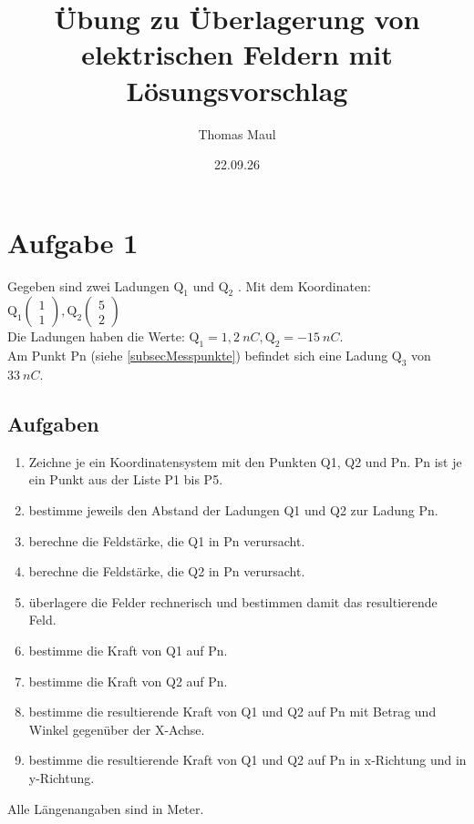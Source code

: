 \documentclass[a4paper,10pt,pdftex,pagesize]{scrartcl}
\author{Thomas Maul}
\title{Übung zu Überlagerung von elektrischen Feldern mit Lösungsvorschlag}
\date{22.09.26}
\begin{document}

\section{Aufgabe 1}
Gegeben sind zwei Ladungen $\text{Q}_1$
und
$\text{Q}_2$ . Mit dem Koordinaten:
\\ $\text{Q}_1 \left( \begin{array}{c} 1\\ 1\end{array} \right), \text{Q}_2 \left( \begin{array}{c} 5\\2                                                  \end{array}
\right)$
\\
Die Ladungen haben die Werte:
$\text{Q}_1 = 1,2\ nC, \text{Q}_2 = -15\ nC$.\\
Am Punkt Pn (siehe \ref{subsecMesspunkte}) befindet sich eine Ladung $\text{Q}_3$ von $33\ nC$.
\subsection{Aufgaben}
\begin{enumerate}
 \item Zeichne je ein Koordinatensystem mit den Punkten Q1, Q2 und Pn. Pn ist je ein Punkt aus der Liste P1 bis P5.
 \item bestimme jeweils den Abstand der Ladungen Q1 und Q2 zur Ladung Pn.
 \item berechne die Feldstärke, die Q1 in Pn verursacht.
 \item berechne die Feldstärke, die Q2 in Pn verursacht.
 \item überlagere die Felder rechnerisch und bestimmen damit das resultierende Feld.
 \item bestimme die Kraft von Q1 auf Pn.
 \item bestimme die Kraft von Q2 auf Pn.
 \item bestimme die resultierende Kraft von Q1 und Q2 auf Pn mit Betrag und Winkel gegenüber der X-Achse.
 \item bestimme die resultierende Kraft von Q1 und Q2 auf Pn in x-Richtung und in y-Richtung.
\end{enumerate}

Alle Längenangaben sind in Meter.
\end{document}

